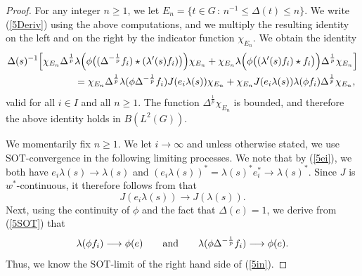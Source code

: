 \documentclass[12pt]{amsart}
\theoremstyle{remark}
\theoremstyle{definition}
\numberwithin{equation}{section}
\begin{document}
\begin{proof}
For any integer $n\geq 1$, we let 
$E_n=\{t\in G\, :\, n^{-1}\leq\Delta(t)\leq n\}$. We write 
(\ref{5Deriv}) using the above computations, 
and we multiply the resulting identity on the left and on the right 
by the indicator function $\chi_{E_n}$. We obtain the identity
\begin{align}\label{5in}
\Delta(s)^{-1}\Bigl[
\chi_{E_n}\Delta^{\frac{1}{p}} & 
\lambda\Bigl(\phi\bigl(
(\Delta^{-\frac{1}{p}}f_i)\star (\lambda'(s)f_i) \bigr)\Bigr)\chi_{E_n}
+\chi_{E_n} \lambda\Bigl(\phi\bigl((\lambda'(s)f_i)\star 
f_i\bigr)\Bigr)\Delta^{\frac{1}{p}}\chi_{E_n} \Bigr]\\
&= \chi_{E_n} \Delta^{\frac{1}{p}}\lambda(\phi\Delta^{-\frac{1}{p}}f_i)
J(e_i\lambda(s))\chi_{E_n} + 
\chi_{E_n} J(e_i\lambda(s))\lambda(\phi f_i)\Delta^{\frac{1}{p}}\chi_{E_n},\nonumber
\end{align}
valid for all $i\in I$ and all $n\geq 1$.
The function $\Delta^{\frac{1}{p}}\chi_{E_n}$ is bounded, and therefore
the above identity holds in $B(L^2(G))$.



We momentarily fix $n\geq 1$. We let $i\to\infty$ and unless otherwise stated,
we use SOT-convergence  in the following limiting processes. We note that by
(\ref{5ei}), we both have $e_i\lambda(s)\to\lambda(s)$ and $(e_i\lambda(s))^* 
= \lambda(s)^*e_i^*\to\lambda(s)^*$.
Since $J$ is $w^*$-continuous, it therefore follows from \cite[Lemma 2.2]{AKLZ} that  
$$
J(e_i\lambda(s))\longrightarrow J(\lambda(s)).
$$
Next, using the continuity
of $\phi$ and the fact that $\Delta(e)=1$, 
we derive from (\ref{5SOT}) that 
$$
\lambda(\phi f_i)\longrightarrow \phi(e)
\qquad\hbox{and}\qquad
\lambda(\phi 
\Delta^{-\frac{1}{p}} f_i)\longrightarrow \phi(e).
$$
Thus, we know the SOT-limit of the right hand side of (\ref{5in}).



\end{proof}
\end{document}
